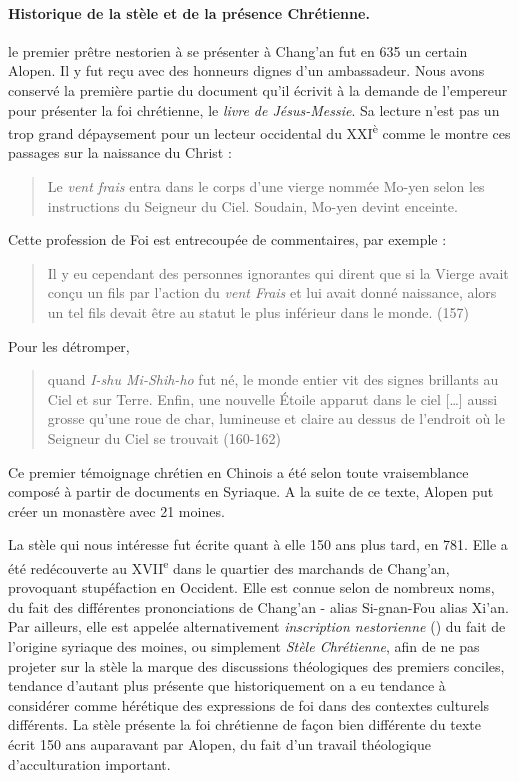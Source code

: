 \paragraph{Historique de la stèle et de la présence Chrétienne.}
le
premier prêtre nestorien à se présenter à Chang'an fut en 635 un
certain Alopen. Il y fut reçu avec des honneurs dignes d'un ambassadeur. Nous avons conservé la première partie du document qu'il écrivit à la demande de l'empereur  pour présenter la foi chrétienne,  le \textit{livre de Jésus-Messie}. Sa lecture n'est pas un trop grand dépaysement pour un lecteur occidental du XXI\textsuperscript{è} comme le montre ces passages sur la naissance du Christ : 
\begin{quote}
    Le \textit{vent frais} entra dans le corps d'une vierge nommée Mo-yen selon les instructions du Seigneur du Ciel. Soudain, Mo-yen devint enceinte.  
\end{quote}
Cette profession de Foi est entrecoupée de commentaires, par exemple : 
\begin{quote}
    Il y eu cependant des personnes ignorantes qui dirent que si la Vierge avait conçu un fils par l'action du \textit{vent Frais} et lui avait donné naissance, alors un tel fils devait être au statut le plus inférieur dans le monde. (157)
\end{quote}
Pour les détromper,
\begin{quote}
     quand \textit{I-shu Mi-Shih-ho} fut né, le monde entier vit des signes brillants au Ciel et sur Terre. Enfin, une nouvelle Étoile apparut dans le ciel  [\ldots] aussi grosse qu'une roue de char, lumineuse et claire au dessus de l'endroit où le Seigneur du Ciel se trouvait (160-162)
\end{quote}
Ce premier témoignage chrétien en Chinois  a été selon toute vraisemblance composé à partir de documents en Syriaque.  
A la suite de ce texte, Alopen put créer un monastère avec 21 moines. 

La stèle qui nous intéresse fut écrite quant à elle 150 ans plus tard, en 781. Elle a été redécouverte au XVII\textsuperscript{e} dans le quartier des marchands de Chang'an, provoquant stupéfaction en Occident. Elle est connue selon de nombreux noms, du fait des différentes prononciations de Chang'an  - alias Si-gnan-Fou alias Xi'an. Par ailleurs, elle est appelée alternativement \textit{inscription nestorienne} (\cite{saeki:nestorianDocumentsChine}) du fait de l'origine syriaque des moines, ou simplement \textit{Stèle Chrétienne}, afin de ne pas projeter sur la stèle la marque des discussions théologiques des premiers conciles, tendance d'autant plus présente que historiquement on a eu tendance à considérer comme hérétique des expressions de foi dans des contextes culturels différents. La stèle présente la foi chrétienne de façon bien différente du texte écrit 150 ans auparavant par Alopen, du fait d'un travail théologique d'acculturation important. 


